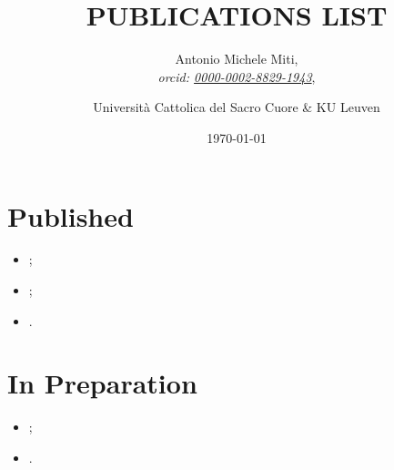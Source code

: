 \documentclass{article}
\title{PUBLICATIONS LIST}
\date{\today}
\author{
	Antonio Michele Miti,\\
	\emph{orcid: \href{https://orcid.org/0000-0002-8829-1943}{0000-0002-8829-1943}},
	\and 
	Università Cattolica del Sacro Cuore \& KU Leuven
}
\begin{document}
  

	\maketitle



  \section*{Published}
	  \begin{itemize}
 	   \item {};
 	   \item {};
 	   \item {}.
	  \end{itemize}




  
  \section*{In Preparation}
	  \begin{itemize}
 	   \item {};
 	   \item {}.
	  \end{itemize}

  
\end{document}
